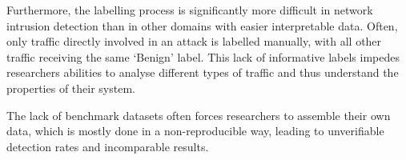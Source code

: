 \documentclass{article}
\begin{document}
Furthermore, the labelling process is significantly more difficult in network intrusion detection than in other domains with easier interpretable data. Often, only traffic directly involved in an attack is labelled manually, with all other traffic receiving the same `Benign' label. This lack of informative labels impedes researchers abilities to analyse different types of traffic and thus understand the properties of their system.

The lack of benchmark datasets often forces researchers to assemble their own data, which is mostly done in a non-reproducible way, leading to unverifiable detection rates and incomparable results.









\end{document}
